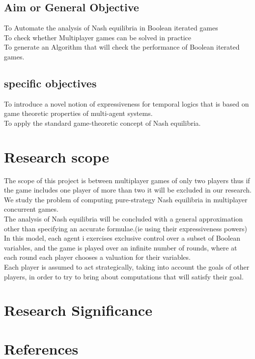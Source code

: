 \documentclass[14pt]{article}
\begin{document}
				\subsection{Aim or General Objective}
					To Automate the analysis of Nash equilibria in Boolean iterated games\\
		To check whether Multiplayer games can be solved in practice\\
		To generate an Algorithm that will check the performance of Boolean iterated games.\\
		
				
				\subsection{specific objectives}
						To introduce a novel notion of expressiveness for temporal logics that is based on game theoretic properties of multi-agent systems.\\
		To apply the standard game-theoretic concept of Nash equilibria.\\

			
			\section{Research scope}
			
				The scope of this project is between multiplayer games of only two players thus if the game includes one player of more than two it will be excluded in our research.\\
	We study the problem of computing pure-strategy Nash equilibria in multiplayer concurrent games.\\
	The analysis of Nash equilibria will be concluded with a general approximation other than specifying an accurate formulae.(ie using their expressiveness powers)\\

	In this model, each agent i exercises exclusive control over a subset of Boolean variables, and the game is played over an infinite number of rounds, where at each round each player chooses a valuation for their variables.\\

	Each player is assumed to act strategically, taking into account the goals of other players,
in order to try to bring about computations that will satisfy their goal.\\

			
			\section{Research Significance}
			
			\section{References}

				
	

	
\end{document}
